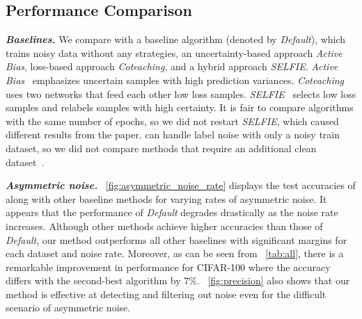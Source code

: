 \subsection{Performance Comparison}

\noindent\emph{\textbf{Baselines.}}
We compare \prgname{} with a baseline algorithm (denoted by \textit{Default}), which trains noisy data without any strategies, an uncertainty-based approach \textit{Active Bias}, loss-based approach \textit{Coteaching}, and a hybrid approach \textit{SELFIE}. \textit{Active Bias}~\cite{chang2017active} emphasizes uncertain samples with high prediction variances. \textit{Coteaching}~\cite{han2018co} uses two networks that feed each other low loss samples. \textit{SELFIE}~\cite{song2019selfie} selects low loss samples and relabels samples with high certainty. It is fair to compare algorithms with the same number of epochs, so we did not restart \textit{SELFIE}, which caused different results from the paper. \prgname{} can handle label noise with only a noisy train dataset, so we did not compare methods that require an additional clean dataset~\cite{shu2019meta}.


\noindent\emph{\textbf{Asymmetric noise.}}
\figurename~\ref{fig:asymmetric_noise_rate} displays the test accuracies of \prgname{} along with other baseline methods for varying rates of asymmetric noise. It appears that the performance of \textit{Default} degrades drastically as the noise rate increases. Although other methods achieve higher accuracies than those of \textit{Default}, our method outperforms all other baselines with significant margins for each dataset and noise rate. Moreover, as can be seen from \tablename~\ref{tab:all}, there is a remarkable improvement in performance for CIFAR-100 where the accuracy differs with the second-best algorithm by 7\%. \figurename~\ref{fig:precision} also shows that our method is effective at detecting and filtering out noise even for the difficult scenario of asymmetric noise. 


\setlength{\tabcolsep}{6pt}
\setlength{\floatsep}{4pt}
\setlength{\textfloatsep}{12pt}

